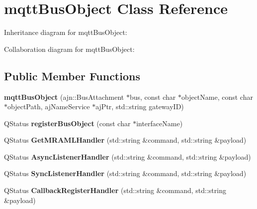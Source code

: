 \hypertarget{classmqttBusObject}{}\section{mqtt\+Bus\+Object Class Reference}
\label{classmqttBusObject}


Inheritance diagram for mqtt\+Bus\+Object\+:


Collaboration diagram for mqtt\+Bus\+Object\+:
\subsection*{Public Member Functions}
\begin{DoxyCompactItemize}
\item 
{\bfseries mqtt\+Bus\+Object} (ajn\+::\+Bus\+Attachment $\ast$bus, const char $\ast$object\+Name, const char $\ast$object\+Path, aj\+Name\+Service $\ast$aj\+Ptr, std\+::string gateway\+ID)\hypertarget{classmqttBusObject_aba21a90fd01c34effb6670407d0cb5fe}{}\label{classmqttBusObject_aba21a90fd01c34effb6670407d0cb5fe}

\item 
Q\+Status {\bfseries register\+Bus\+Object} (const char $\ast$interface\+Name)\hypertarget{classmqttBusObject_af6a71a7deaf05376f4ecf2850c104091}{}\label{classmqttBusObject_af6a71a7deaf05376f4ecf2850c104091}

\item 
Q\+Status {\bfseries Get\+M\+R\+A\+M\+L\+Handler} (std\+::string \&command, std\+::string \&payload)\hypertarget{classmqttBusObject_a5a2222e696c7681a9f46ffea8b41fb5a}{}\label{classmqttBusObject_a5a2222e696c7681a9f46ffea8b41fb5a}

\item 
Q\+Status {\bfseries Async\+Listener\+Handler} (std\+::string \&command, std\+::string \&payload)\hypertarget{classmqttBusObject_af059f4fdf4154839980041cbfecde69e}{}\label{classmqttBusObject_af059f4fdf4154839980041cbfecde69e}

\item 
Q\+Status {\bfseries Sync\+Listener\+Handler} (std\+::string \&command, std\+::string \&payload)\hypertarget{classmqttBusObject_a1a6e48f080e8510eddbe9181112a4ff4}{}\label{classmqttBusObject_a1a6e48f080e8510eddbe9181112a4ff4}

\item 
Q\+Status {\bfseries Callback\+Register\+Handler} (std\+::string \&command, std\+::string \&payload)\hypertarget{classmqttBusObject_a968d7077f427af061dd7ef688bc2fe76}{}\label{classmqttBusObject_a968d7077f427af061dd7ef688bc2fe76}


\end{DoxyCompactItemize}
